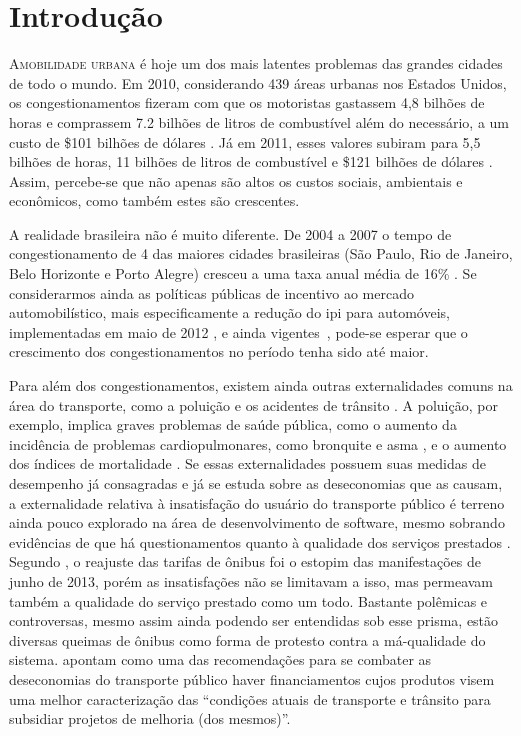 \chapter{Introdução}\label{chp:Introdução}
\lettrine{A}{mobilidade urbana} é hoje um dos mais latentes problemas das grandes cidades de todo o mundo. Em 2010, considerando 439 áreas urbanas nos Estados Unidos, os congestionamentos fizeram com que os motoristas gastassem 4,8 bilhões de horas e comprassem 7.2 bilhões de litros de combustível além do necessário, a um custo de \$101 bilhões de dólares \cite{Eisele2011}. Já em 2011, esses valores subiram para 5,5 bilhões de horas, 11 bilhões de litros de combustível e \$121 bilhões de dólares \cite{Schrank2012}. 
Assim, percebe-se que não apenas são altos os custos sociais, ambientais e econômicos, como também estes são crescentes.

A realidade brasileira não é muito diferente. De 2004 a 2007 o tempo de congestionamento de 4 das maiores cidades brasileiras (São Paulo, Rio de Janeiro, Belo Horizonte e Porto Alegre) cresceu a uma taxa anual média de 16\% \cite{resende2009}. Se considerarmos ainda as políticas públicas de incentivo ao mercado automobilístico, mais especificamente a redução do \gls{ipi} para automóveis, implementadas em maio de 2012 \cite{brasil2011}, e ainda vigentes~\cite{brasil2012}, pode-se esperar que o crescimento dos congestionamentos no período tenha sido até maior.

Para além dos congestionamentos, existem ainda outras externalidades comuns na área do transporte, como a poluição e os acidentes de trânsito \cite{vasconcellos1998}. A poluição, por exemplo, implica graves problemas de saúde pública, como o aumento da incidência de problemas cardiopulmonares, como bronquite e asma \cite{kunzli2000}, e o aumento dos índices de mortalidade \cite{finkelstein2004}.
Se essas externalidades possuem suas medidas de desempenho já consagradas e já se estuda sobre as deseconomias que as causam, a externalidade relativa à insatisfação do usuário do transporte público é terreno ainda pouco explorado na área de desenvolvimento de software, mesmo sobrando evidências de que há questionamentos quanto à qualidade dos serviços prestados \cite{UrbanaPE2010,Rodrigues,Rodrigues2006,Cellos2012}. Segundo , o reajuste das tarifas de ônibus foi o estopim das manifestações de junho de 2013, porém as insatisfações não se limitavam a isso, mas permeavam também a qualidade do serviço prestado como um todo. Bastante polêmicas e controversas, mesmo assim ainda podendo ser entendidas sob esse prisma, estão diversas queimas de ônibus como forma de protesto contra a má-qualidade do sistema.  apontam como uma das recomendações para se combater as deseconomias do transporte público haver financiamentos cujos produtos visem uma melhor caracterização das ``condições atuais de transporte e trânsito para subsidiar projetos de melhoria (dos mesmos)''.


